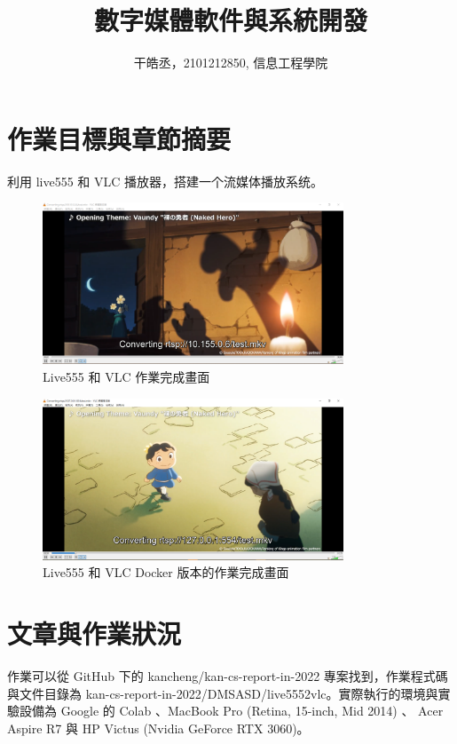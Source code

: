 \documentclass[10pt,UTF8]{ctexart}
\title{數字媒體軟件與系統開發}
\author{干皓丞，2101212850, 信息工程學院}
\begin{document}
\maketitle


\section{作業目標與章節摘要}

利用 live555 和 VLC 播放器，搭建一个流媒体播放系统。

\begin{figure}[H]
\centering 
\includegraphics[width=0.80\textwidth]{13.png} 
\caption{Live555 和 VLC 作業完成畫面}
\label{Test}
\end{figure}

\begin{figure}[H]
\centering 
\includegraphics[width=0.80\textwidth]{17.png} 
\caption{Live555 和 VLC  Docker 版本的作業完成畫面}
\label{Test}
\end{figure}


\section{文章與作業狀況}

作業可以從 GitHub 下的 kancheng/kan-cs-report-in-2022 專案找到，作業程式碼與文件目錄為 kan-cs-report-in-2022/DMSASD/live5552vlc。實際執行的環境與實驗設備為 Google 的 Colab 、MacBook Pro (Retina, 15-inch, Mid 2014) 、 Acer Aspire R7 與 HP Victus (Nvidia GeForce RTX 3060)。
\end{document}
